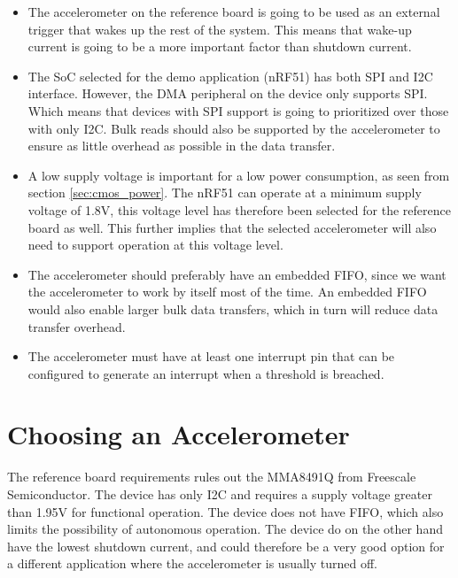 \begin{itemize}
\item The accelerometer on the reference board is going to be used as an external trigger that wakes up the rest of the system. This means that wake-up current is going to be a more important factor than shutdown current.
\item The SoC selected for the demo application (nRF51) has both SPI and I2C interface. However, the DMA peripheral on the device only supports SPI. Which means that devices with SPI support is going to prioritized over those with only I2C. Bulk reads should also be supported by the accelerometer to ensure as little overhead as possible in the data transfer. 
\item A low supply voltage is important for a low power consumption, as seen from section \ref{sec:cmos_power}. The nRF51 can operate at a minimum supply voltage of 1.8V, this voltage level has therefore been selected for the reference board as well. This further implies that the selected accelerometer will also need to support operation at this voltage level.
\item The accelerometer should preferably have an embedded FIFO, since we want the accelerometer to work by itself most of the time. An embedded FIFO would also enable larger bulk data transfers, which in turn will reduce data transfer overhead.
\item The accelerometer must have at least one interrupt pin that can be configured to generate an interrupt when a threshold is breached.
\end{itemize}

\section{Choosing an Accelerometer}

The reference board requirements rules out the MMA8491Q from Freescale Semiconductor. The device has only I2C and requires a supply voltage greater than 1.95V for functional operation. The device does not have FIFO, which also limits the possibility of autonomous operation. The device do on the other hand have the lowest shutdown current, and could therefore be a very good option for a different application where the accelerometer is usually turned off. 

